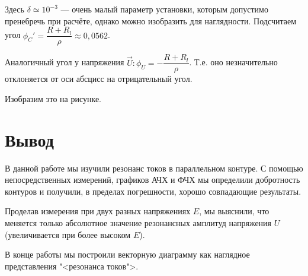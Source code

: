 \documentclass[12pt]{kiarticle} %
\begin{document}
Здесь $ \delta \simeq 10^{-3}$ --- очень малый параметр установки, которым допустимо пренебречь при расчёте, однако можно изобразить для наглядности. Подсчитаем угол $ \phi_C' =   \dfrac{R + R_l}{\rho} \approx 0,0562 $. 

Аналогичный угол у напряжения $ \vec{U}: \phi_U = - \dfrac{R + R_l}{\rho} $. Т.е. оно незначительно отклоняется от оси абсцисс на отрицательный угол.

Изобразим это на рисунке. 

\section{Вывод}

В данной работе мы изучили резонанс токов в параллельном контуре. С помощью непосредственных измерений, графиков АЧХ и ФЧХ мы определили добротность контуров и получили, в пределах погрешности, хорошо совпадающие результаты. 

Проделав измерения при двух разных напряжениях $ E $, мы выяснили, что меняется только абсолютное значение резонансных амплитуд напряжения $ U $ (увеличивается при более высоком $ E $). 

В конце работы мы построили векторную диаграмму как наглядное представления "<резонанса токов">. 
\end{document}
